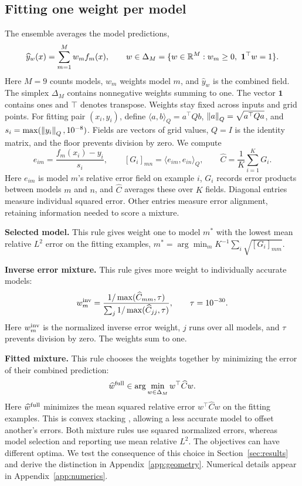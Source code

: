 \subsection{Fitting one weight per model}
The ensemble averages the model predictions,
\begin{equation}
 \widehat y_w(x)=\sum_{m=1}^M w_m f_m(x),\qquad
 w\in\Delta_M=\{w\in\mathbb{R}^M:w_m\geq0,\ \mathbf{1}^\top w=1\}.
 \label{eq:mixture}
\end{equation}
Here $M=9$ counts models, $w_m$ weights model $m$, and $\widehat y_w$ is the
combined field. The simplex $\Delta_M$ contains nonnegative weights summing to
one. The vector $\mathbf{1}$ contains ones and $\top$ denotes transpose.
Weights stay fixed across inputs and grid points. For fitting pair $(x_i,y_i)$,
define $\langle a,b\rangle_Q=a^\top Qb$, $\left\lVert a\right\rVert_Q=\sqrt{a^\top Qa}$, and
$s_i=\max(\left\lVert y_i\right\rVert_Q,10^{-8})$. Fields are vectors of grid values, $Q=I$ is
the identity matrix, and the floor prevents division by zero. We compute
\begin{equation}
 e_{im}=\frac{f_m(x_i)-y_i}{s_i},\qquad
 [G_i]_{mn}=\langle e_{im},e_{in}\rangle_Q,\qquad
 \widehat C=\frac{1}{K}\sum_{i=1}^K G_i.
 \label{eq:gram}
\end{equation}
Here $e_{im}$ is model $m$'s relative error field on example $i$, $G_i$ records
error products between models $m$ and $n$, and $\widehat C$ averages these over
$K$ fields. Diagonal entries measure individual squared error. Other entries
measure error alignment, retaining information needed to score a mixture.

\noindent\textbf{Selected model.} This rule gives weight one to model $m^*$
with the lowest mean relative $L^2$ error on the fitting examples,
$m^*=\arg\min_m K^{-1}\sum_i\sqrt{[G_i]_{mm}}$.

\noindent\textbf{Inverse error mixture.} This rule gives more weight to individually
accurate models:
\begin{equation}
 w_m^{\rm inv}=\frac{1/\max(\widehat C_{mm},\tau)}
 {\sum_j 1/\max(\widehat C_{jj},\tau)},\qquad \tau=10^{-30}.
\label{eq:inverse}
\end{equation}
Here $w_m^{\rm inv}$ is the normalized inverse error weight, $j$ runs over all
models, and $\tau$ prevents division by zero. The weights sum to one.

\noindent\textbf{Fitted mixture.} This rule chooses the weights together by minimizing
the error of their combined prediction:
\begin{equation}
 \widehat w^{\rm full}\in\arg\min_{w\in\Delta_M}w^\top\widehat Cw.
 \label{eq:stack}
\end{equation}
Here $\widehat w^{\rm full}$ minimizes the mean squared relative error
$w^\top\widehat Cw$ on the fitting examples. This is convex stacking
\citep{wolpert1992,breiman1996}, allowing a less accurate model to offset another's errors.
Both mixture rules use squared normalized errors, whereas model selection and
reporting use mean relative $L^2$. The objectives can have different optima.
We test the consequence of this choice in Section~\ref{sec:results} and derive
the distinction in Appendix~\ref{app:geometry}. Numerical details appear in
Appendix~\ref{app:numerics}.

